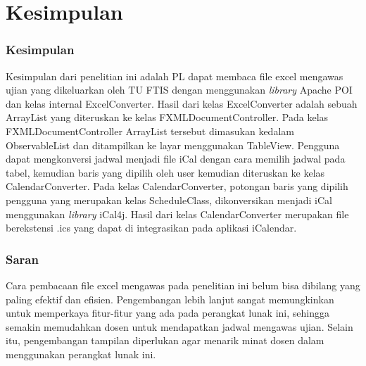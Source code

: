 \chapter{Kesimpulan}
\label{chap:summary}

\subsection{Kesimpulan}

Kesimpulan dari penelitian ini adalah PL dapat membaca file excel mengawas ujian yang dikeluarkan oleh TU FTIS dengan menggunakan \textit{library} Apache POI dan kelas internal ExcelConverter. Hasil dari kelas ExcelConverter adalah sebuah ArrayList yang diteruskan ke kelas FXMLDocumentController. Pada kelas FXMLDocumentController ArrayList tersebut dimasukan kedalam ObservableList dan ditampilkan ke layar menggunakan TableView. Pengguna dapat mengkonversi jadwal menjadi file iCal dengan cara memilih jadwal pada tabel, kemudian baris yang dipilih oleh user kemudian diteruskan ke kelas CalendarConverter. Pada kelas CalendarConverter, potongan baris yang dipilih pengguna yang merupakan kelas ScheduleClass, dikonversikan menjadi iCal menggunakan \textit{library} iCal4j. Hasil dari kelas CalendarConverter merupakan file berekstensi .ics yang dapat di integrasikan pada aplikasi iCalendar.       
 
\subsection{Saran}
Cara pembacaan file excel mengawas pada penelitian ini belum bisa dibilang yang paling efektif dan efisien. Pengembangan lebih lanjut sangat memungkinkan untuk memperkaya fitur-fitur yang ada pada perangkat lunak ini, sehingga semakin memudahkan dosen untuk mendapatkan jadwal mengawas ujian. Selain itu, pengembangan tampilan diperlukan agar menarik minat dosen dalam menggunakan perangkat lunak ini. 
